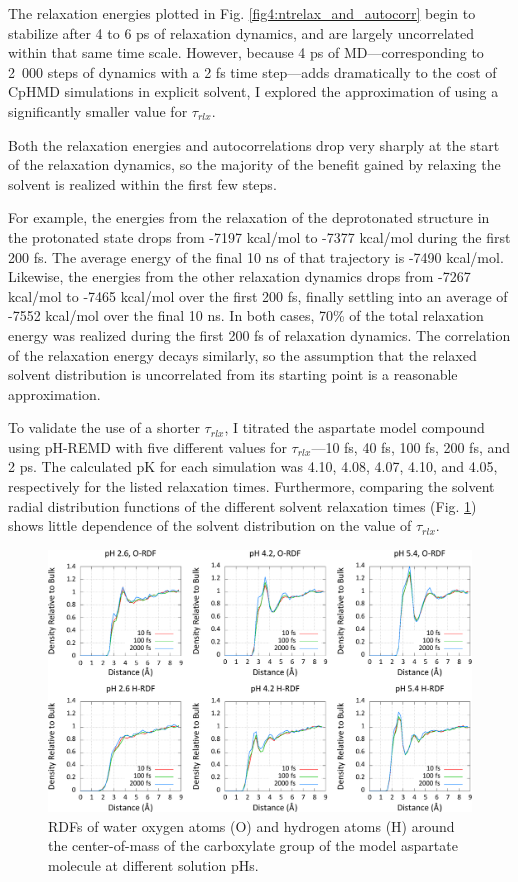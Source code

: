 The relaxation energies plotted in Fig. \ref{fig4:ntrelax_and_autocorr} begin to
stabilize after 4 to 6 ps of relaxation dynamics, and are largely uncorrelated
within that same time scale. However, because 4 ps of MD---corresponding to
\mbox{2 000} steps of dynamics with a 2 fs time step---adds dramatically to the
cost of CpHMD simulations in explicit solvent, I explored the approximation of
using a significantly smaller value for $\tau _ {rlx}$.

Both the relaxation energies and autocorrelations drop very sharply at the start
of the relaxation dynamics, so the majority of the benefit gained by relaxing
the solvent is realized within the first few steps.

For example, the energies from the relaxation of the deprotonated structure in
the protonated state drops from -7197 kcal/mol to -7377 kcal/mol during the
first 200 fs. The average energy of the final 10 ns of that trajectory is -7490
kcal/mol. Likewise, the energies from the other relaxation dynamics drops from
-7267 kcal/mol to -7465 kcal/mol over the first 200 fs, finally settling into an
average of -7552 kcal/mol over the final 10 ns. In both cases, 70\% of the total
relaxation energy was realized during the first 200 fs of relaxation dynamics.
The correlation of the relaxation energy decays similarly, so the assumption
that the relaxed solvent distribution is uncorrelated from its starting point is
a reasonable approximation.

To validate the use of a shorter $\tau _ {rlx}$, I titrated the aspartate model
compound using pH-REMD with five different values for $\tau _ {rlx}$---10 fs, 40
fs, 100 fs, 200 fs, and 2 ps. The calculated pK for each simulation was
4.10, 4.08, 4.07, 4.10, and 4.05, respectively for the listed relaxation times.
Furthermore, comparing the solvent radial distribution functions of the
different solvent relaxation times (Fig. \ref{fig4:ntrelax_rdfs}) shows little
dependence of the solvent distribution on the value of $\tau _ {rlx}$.

\begin{figure}
   \includegraphics[width=6.5in]{ntrelax_radial_ph.eps}
   \caption{RDFs of water oxygen atoms (O) and hydrogen atoms (H) around the
            center-of-mass of the carboxylate group of the model aspartate
            molecule at different solution pHs.}
   \label{fig4:ntrelax_rdfs}
\end{figure}


